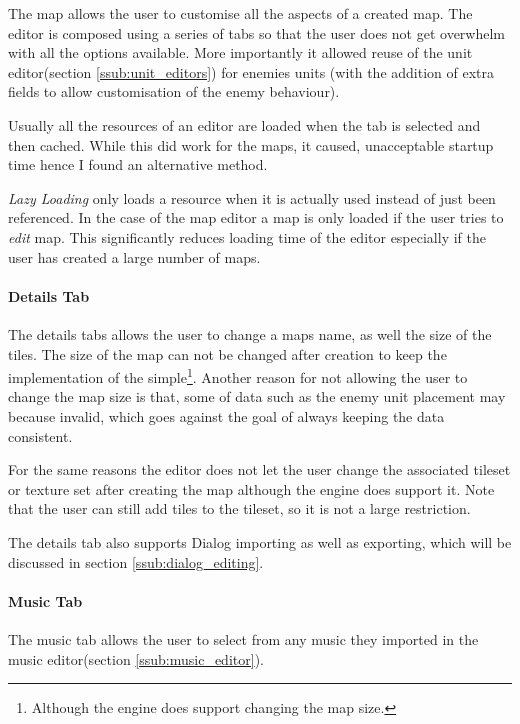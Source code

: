 The map allows the user to customise all the aspects of a created map.  The editor is composed using a series of tabs so that the user does not get overwhelm with all the options available. More importantly it allowed reuse of the unit editor(section \ref{ssub:unit_editors}) for enemies units (with the addition  of extra fields to allow customisation of the enemy behaviour).

Usually all the resources of an editor are loaded when the tab is selected and then cached.  While this did work for the maps, it caused, unacceptable startup time hence I found an alternative method. 

\emph{Lazy Loading} only loads a resource when it is actually used instead of just been referenced. In the case of the map editor a map is only loaded if the user tries to \emph{edit} map. This significantly reduces loading time of the editor especially if the user has created a large number of maps.


\paragraph{Details Tab\\}
The details tabs allows the user to change a maps name, as well the size of the tiles.  The size of the map can not be changed after creation to keep the implementation of the simple\footnote{Although the engine does support changing the map size.}. Another reason for not allowing the user to change the map size is that, some of data such as the enemy unit placement may because invalid, which goes against the goal of always keeping the data consistent.  

For the same reasons the editor does not let the user change the associated tileset or texture set after creating the map  although the engine does support it. Note that the user can still add tiles to the tileset, so it is not a large restriction.

The details tab also supports Dialog importing as well as exporting, which will be discussed in section \ref{ssub:dialog_editing}.

\paragraph{Music Tab\\}
The music tab allows the user to select from any music they imported in the music editor(section \ref{ssub:music_editor}).


